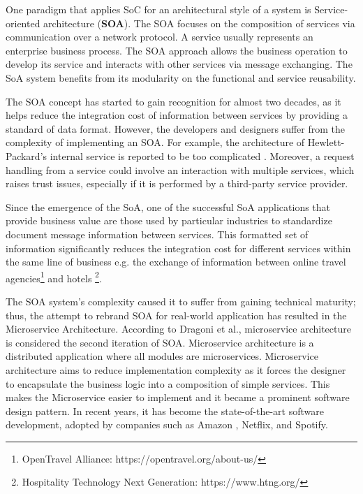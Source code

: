 One paradigm that applies SoC for an architectural style of a system is  Service-oriented architecture (\textbf{SOA}). The SOA focuses on the composition of services via communication over a network protocol. A service usually represents an enterprise business process. The SOA approach allows the business operation to develop its service and interacts with other services via message exchanging. The SoA system benefits from its modularity on the functional and service reusability\cite{SOAopengroup}.

The SOA concept has started to gain recognition for almost two decades, as it helps reduce the integration cost of information between services by providing a standard of data format. However, the developers and designers suffer from the complexity of implementing an SOA. For example, the architecture of Hewlett-Packard's internal service is reported to be too complicated \cite{davenport-2016}. Moreover, a request handling from a service could involve an interaction with multiple services, which raises trust issues, especially if it is performed by a third-party service provider.

Since the emergence of the SoA, one of the successful SoA applications that provide business value are those used by particular industries to standardize document message information between services. This formatted set of information significantly reduces the integration cost for different services within the same line of business e.g. the exchange of information between online travel agencies\footnote{
    OpenTravel Alliance: https://opentravel.org/about-us/
} and hotels 
\footnote{
    Hospitality Technology Next Generation: https://www.htng.org/
}.

The SOA system's complexity caused it to suffer from gaining technical maturity; thus, the attempt to rebrand SOA for real-world application has resulted in the Microservice Architecture. According to Dragoni et al., microservice architecture is considered the second iteration of SOA. Microservice architecture is a distributed application where all modules are microservices\cite{Dragoni2017}. Microservice architecture aims to reduce implementation complexity as it forces the designer to encapsulate the business logic into a composition of simple services. This makes the Microservice easier to implement and it became a prominent software design pattern. In recent years, it has become the state-of-the-art software development, adopted by companies such as Amazon \cite{iii-2015}, Netflix\cite{blog-2018}, and Spotify\cite{cope-2020}.

